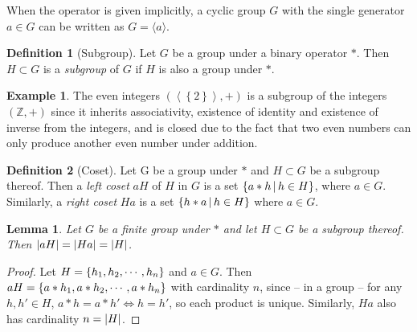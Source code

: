 \documentclass[a4paper,twoside,12pt,openany]{report}
\theoremstyle{plain}
\newtheorem{lemma}{Lemma}
\theoremstyle{definition}
\newtheorem{definition}{Definition}
\newtheorem{example}{Example}
\theoremstyle{remark}
\begin{document}
When the operator is given implicitly, a cyclic group \(G\) with the single generator \(a\in G\) can be written as \(G = \langle a\rangle\).

\begin{definition}[Subgroup]
	Let \(G\) be a group under a binary operator \(*\). Then \(H\subset G\) is a \emph{subgroup} of \(G\) if \(H\) is also a group under \(*\).
\end{definition}

\begin{example}
	The even integers \(\left(\left\langle\left\{ 2 \right\}\right\rangle,+\right)\) is a subgroup of the integers \(\left(\mathbb{Z},+\right)\) since it inherits associativity, existence of identity and existence of inverse from the integers, and is closed due to the fact that two even numbers can only produce another even number under addition.
\end{example}

\begin{definition}[Coset]
	Let G be a group under \(*\) and \(H\subset G\) be a subgroup thereof. Then a \emph{left coset} \(aH\) of \(H\) in \(G\) is a set \(\left\{ a*h \,\middle|\, h\in H \right\}\), where \(a\in G\). Similarly, a \textit{right coset} \(Ha\) is a set \(\left\{ h*a \,\middle|\, h\in H \right\}\) where \(a\in G\).
\end{definition}

\begin{lemma}\label{cardcosetlemma}
	Let \(G\) be a finite group under \(*\) and let \(H\subset G\) be a subgroup thereof. Then \(\left|aH\right|=\left|Ha\right|=\left|H\right|\).
\end{lemma}

\begin{proof}
	Let \(H=\left\{ h_1,h_2,\cdots,h_n \right\}\) and \(a\in G\). Then \(aH=\left\{ a*h_1,a*h_2,\cdots,a*h_n \right\}\) with cardinality \(n\), since -- in a group -- for any \(h,h'\in H\), \(a*h=a*h'\iff h=h'\), so each product is unique. Similarly, \(Ha\) also has cardinality \(n=\left|H\right|\).
\end{proof}
\end{document}
